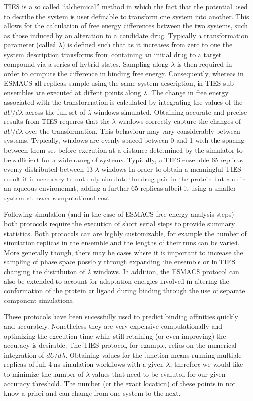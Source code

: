 TIES is a so called ``alchemical'' method in which the fact that the potential used to decribe the system is user definable to transform one
system into another.
This allows for the calculation of free energy differences between the two
systems, such as those induced by an alteration to a candidate drug.
Typically a transformation parameter (called $\lambda$) is defined such that as it increases from zero to one the system description transforms from containing an
initial drug to a target compound via a series of hybrid states.
Sampling along $\lambda$ is then required in order to compute the difference in binding free energy.
Consequently, whereas in ESMACS all replicas sample using the same system description,
in TIES sub-ensembles are executed at diffent points along $\lambda$.
The change in free energy associated with the transformation is calculated by integrating the
values of the $dU/d\lambda$ across the full set of $\lambda$ windows simulated.
Obtaining accurate and precise results from TIES requires that the $\lambda$ windows correctly
capture the changes of $dU/d\lambda$ over the transformation.
This behaviour may vary considerably between systems.
Typically, windows are evenly spaced between 0 and 1 with the spacing between them set before
execution at a distance determined by the simulator to be sufficient for a wide raneg of systems.
Typically, a TIES ensemble 65 replicas evenly distributed between 13 $\lambda$ windows
In order to obtain a meaningful TIES result it is necessary to not only simulate the drug pair
in the protein but also in an aqueous environemnt, adding a further 65 replicas albeit it using a
smaller system at lower computational cost.

Following simulation (and in the case of ESMACS free energy analysis steps) both protocols require
the execution of short serial steps to provide summary statistics.
Both protocols can are highly customizable, for example the number of simulation replicas in the
ensemble and the lengths of their runs can be varied.
More generally though, there may be cases where it is important to increase the sampling of phase
space possibly through expanding the ensemble or in TIES changing the distributon of $\lambda$
windows.
In addition, the ESMACS protocol can also be extended to account for adaptation energies involved
in altering the conformation of the protein or ligand during binding through the use of separate
component simulations.

These protocols have been sucessfully used to predict binding affinities
quickly and accurately. Nonetheless they are very expensive computationally and
optimizing the execution time while still retaining (or even improving) the
accuracy is desirable. The TIES protocol, for example, relies on the numerical
integration of $dU/d\lambda$. Obtaining values for the function means running
multiple replicas of full 4 ns simulation workflows with a given $\lambda$,
therefore we would like to minimize the number of $\lambda$ values that need to 
be evaluted for our given accuracy threshold. The number (or the exact
location) of these points in not know a priori and can change from one system
to the next.

